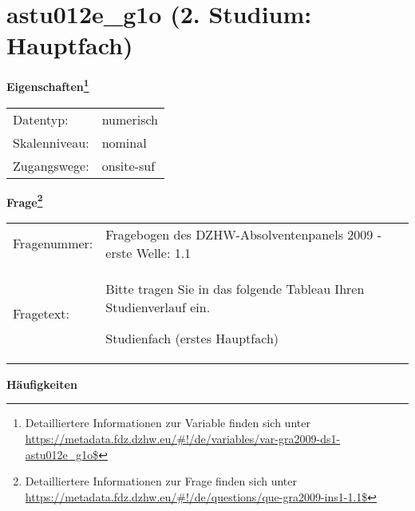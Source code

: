
    \setcounter{footnote}{0}

    \vspace*{-1.8cm}
	\section{astu012e\_g1o (2. Studium: Hauptfach)}
	\label{section:astu012e_g1o}



    \vspace*{0.5cm}
    \noindent\textbf{Eigenschaften\footnote{Detailliertere Informationen zur Variable finden sich unter
		\url{https://metadata.fdz.dzhw.eu/\#!/de/variables/var-gra2009-ds1-astu012e_g1o$}}}\\
	\begin{tabularx}{\hsize}{@{}lX}
	Datentyp: & numerisch \\
	Skalenniveau: & nominal \\
	Zugangswege: &
	  onsite-suf
 \\
    \end{tabularx}



				\vspace*{0.5cm}
                \noindent\textbf{Frage\footnote{Detailliertere Informationen zur Frage finden sich unter
		              \url{https://metadata.fdz.dzhw.eu/\#!/de/questions/que-gra2009-ins1-1.1$}}}\\
				\begin{tabularx}{\hsize}{@{}lX}
					Fragenummer: &
					  Fragebogen des DZHW-Absolventenpanels 2009 - erste Welle:
					  1.1
 \\
					Fragetext: & Bitte tragen Sie in das folgende Tableau Ihren Studienverlauf ein.\par  Studienfach (erstes Hauptfach) \\
				\end{tabularx}





        		\vspace*{0.5cm}
                \noindent\textbf{Häufigkeiten}

